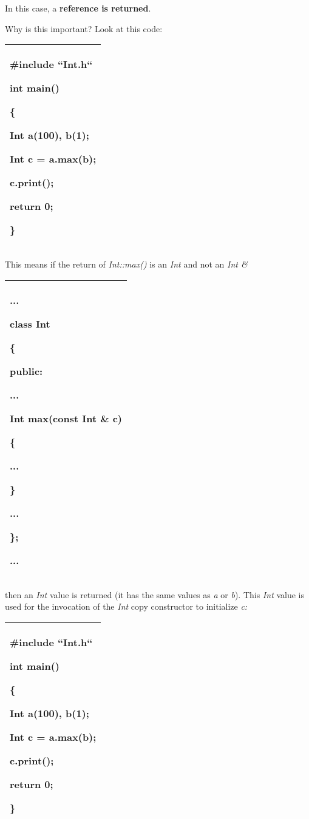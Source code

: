 \documentclass[
]{article}
\begin{document}
In this case, a \textbf{reference is returned}.

Why is this important? Look at this code:

\begin{longtable}[]{@{}l@{}}
\toprule
\endhead
\begin{minipage}[t]{0.97\columnwidth}\raggedright
\#include ``Int.h``

int main()

\{

Int a(100), b(1);

Int c = a.max(b);

c.print();

return 0;

\}\strut
\end{minipage}\tabularnewline
\bottomrule
\end{longtable}

This means if the return of \emph{Int::max()} is an \emph{Int} and not
an \emph{Int \&}

\begin{longtable}[]{@{}l@{}}
\toprule
\endhead
\begin{minipage}[t]{0.97\columnwidth}\raggedright
...

class Int

\{

public:

...

\textbf{Int} max(const Int \& c)

\{

...

\}

...

\};

...\strut
\end{minipage}\tabularnewline
\bottomrule
\end{longtable}

then an \emph{Int} value is returned (it has the same values as \emph{a}
or \emph{b}). This \emph{Int} value is used for the invocation of the
\emph{Int} copy constructor to initialize \emph{c:}

\begin{longtable}[]{@{}l@{}}
\toprule
\endhead
\begin{minipage}[t]{0.97\columnwidth}\raggedright
\#include ``Int.h``

int main()

\{

Int a(100), b(1);

Int c = a.max(b);

c.print();

return 0;

\}\strut
\end{minipage}\tabularnewline
\bottomrule
\end{longtable}
\end{document}

